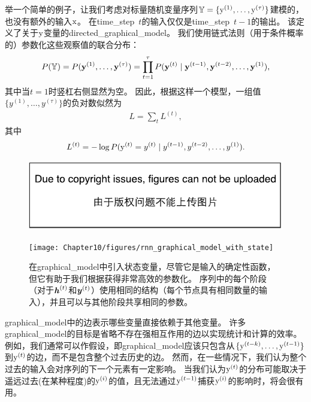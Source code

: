 举一个简单的例子，让我们考虑对标量随机变量序列$ \mathbb{Y} = \{\mathrm{y}^{(1)},\dots,\mathrm{y}^{(\tau)}\}$建模的，也没有额外的输入$\mathrm{x}$。
在\gls{time_step}~$t$的输入仅仅是\gls{time_step}~$t-1$的输出。
该定义了关于$\mathrm{y}$变量的\gls{directed_graphical_model}。
我们使用链式法则（用于条件概率的）参数化这些观察值的联合分布：
\begin{align}
 P(\mathbb{Y}) = P(\mathbf{y}^{(1)},\dots,\mathbf{y}^{(\tau)}) = \prod_{t=1}^{\tau}P(\mathbf{y}^{(t)} \mid \mathbf{y}^{(t-1)},\mathbf{y}^{(t-2)},
 \dots,\mathbf{y}^{(1)}),
\end{align}
其中当$t=1$时竖杠右侧显然为空。
因此，根据这样一个模型，一组值$\{y^{(1)},\dots,y^{(\tau)} \}$的负对数似然为
\begin{align}
 L = \sum_{t} L^{(t)},
\end{align}
其中
\begin{align}
 L^{(t)} = -\log P(\mathrm{y}^{(t)} = y^{(t)} \mid y^{(t-1)},y^{(t-2)}, \dots, y^{(1)}).
\end{align}
\begin{figure}[!htb]
\ifOpenSource
\centerline{\includegraphics{figure.pdf}}
\else
\centerline{\texttt{[image: Chapter10/figures/rnn\_graphical\_model\_with\_state]}}
\fi
\caption{在\gls{graphical_model}中引入状态变量，尽管它是输入的确定性函数，但它有助于我们根据获得非常高效的参数化。
序列中的每个阶段（对于$\boldsymbol{\mathit{h}}^{(t)}$和$\boldsymbol{\mathit{y}}^{(t)}$）使用相同的结构（每个节点具有相同数量的输入），并且可以与其他阶段共享相同的参数。
}
\label{fig:chap10_rnn_graphical_model_with_state}
\end{figure}

\gls{graphical_model}中的边表示哪些变量直接依赖于其他变量。
许多\gls{graphical_model}的目标是省略不存在强相互作用的边以实现统计和计算的效率。
例如，我们通常可以作假设，即\gls{graphical_model}应该只包含从$\{ \mathrm{y}^{(t-k)}, \dots, \mathrm{y}^{(t-1)}\}$到$\mathrm{y}^{(t)}$的边，而不是包含整个过去历史的边。
然而，在一些情况下，我们认为整个过去的输入会对序列的下一个元素有一定影响。
当我们认为$\mathrm{y}^{(t)}$的分布可能取决于遥远过去(在某种程度)的$\mathrm{y}^{(i)}$的值，且无法通过$\mathrm{y}^{(t-1)}$捕获$\mathrm{y}^{(i)}$的影响时，将会很有用。

